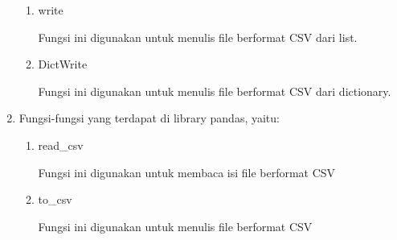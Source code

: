 \begin{enumerate}
\begin{enumerate}
		\item write
		
		Fungsi ini digunakan untuk menulis file berformat CSV dari list.
		
		
		
		\item DictWrite
		
		Fungsi ini digunakan untuk menulis file berformat CSV dari dictionary.
		
		
		
	\end{enumerate}
	
	\item Fungsi-fungsi yang terdapat di library pandas, yaitu:
	\begin{enumerate}
		\item read\_csv
		
		Fungsi ini digunakan untuk membaca isi file berformat CSV
		
		
		
		\item to\_csv
		
		Fungsi ini digunakan untuk menulis file berformat CSV
		
		
		
	\end{enumerate}
\end{enumerate}




\newpage
